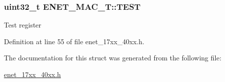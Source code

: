 \subsubsection[{\texorpdfstring{T\+E\+ST}{TEST}}]{ uint32\+\_\+t E\+N\+E\+T\+\_\+\+M\+A\+C\+\_\+\+T\+::\+T\+E\+ST}\hypertarget{structENET__MAC__T_a3ba308b4a368f475aa4b2136faa88f6f}{}\label{structENET__MAC__T_a3ba308b4a368f475aa4b2136faa88f6f}
Test register 

Definition at line 55 of file enet\+\_\+17xx\+\_\+40xx.\+h.



The documentation for this struct was generated from the following file\+:\begin{DoxyCompactItemize}
\item 
\hyperlink{enet__17xx__40xx_8h}{enet\+\_\+17xx\+\_\+40xx.\+h}\end{DoxyCompactItemize}
